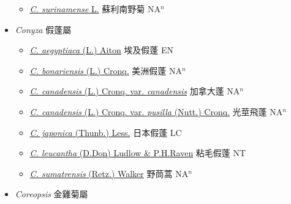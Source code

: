 \begin{itemize}
  \begin{itemize}
        \item[] \href{http://www.theplantlist.org/tpl1.1/search?q=Clibadium+surinamense}{\textit{C. surinamense} L.}   蘇利南野菊 NA$^n$
  \end{itemize}
 \item[] \textit{Conyza} 假蓬屬
                    
  \begin{itemize}
        \item[] \href{http://www.theplantlist.org/tpl1.1/search?q=Conyza+aegyptiaca}{\textit{C. aegyptiaca} (L.) Aiton}   埃及假蓬 EN
        \item[] \href{http://www.theplantlist.org/tpl1.1/search?q=Conyza+bonariensis}{\textit{C. bonariensis} (L.) Cronq.}   美洲假蓬 NA$^n$
        \item[] \href{http://www.theplantlist.org/tpl1.1/search?q=Conyza+canadensis+var.+canadensis}{\textit{C. canadensis} (L.) Cronq. var. \textit{canadensis}}   加拿大蓬 NA$^n$
        \item[] \href{http://www.theplantlist.org/tpl1.1/search?q=Conyza+canadensis+var.+pusilla}{\textit{C. canadensis} (L.) Cronq. var. \textit{pusilla} (Nutt.) Cronq.}   光莖飛蓬 NA$^n$
        \item[] \href{http://www.theplantlist.org/tpl1.1/search?q=Conyza+japonica}{\textit{C. japonica} (Thunb.) Less.}   日本假蓬 LC
        \item[] \href{http://www.theplantlist.org/tpl1.1/search?q=Conyza+leucantha}{\textit{C. leucantha} (D.Don) Ludlow \& P.H.Raven}   粘毛假蓬 NT
        \item[] \href{http://www.theplantlist.org/tpl1.1/search?q=Conyza+sumatrensis}{\textit{C. sumatrensis} (Retz.) Walker}   野茼蒿 NA$^n$
  \end{itemize}
 \item[] \textit{Coreopsis} 金雞菊屬
                    

\end{itemize}
